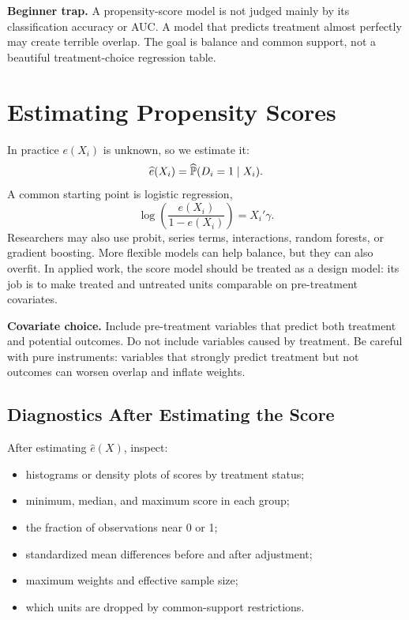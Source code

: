 \begin{boxF}
\textbf{Beginner trap.} A propensity-score model is not judged mainly by its
classification accuracy or AUC. A model that predicts treatment almost
perfectly may create terrible overlap. The goal is balance and common support,
not a beautiful treatment-choice regression table.
\end{boxF}

\section{Estimating Propensity Scores}

In practice \(e(X_i)\) is unknown, so we estimate it:
\[
    \widehat e(X_i)=\widehat{\mathbb{P}}(D_i=1\mid X_i).
\]
A common starting point is logistic regression,
\[
    \log\left(\frac{e(X_i)}{1-e(X_i)}\right)=X_i'\gamma.
\]
Researchers may also use probit, series terms, interactions, random forests, or
gradient boosting. More flexible models can help balance, but they can also
overfit. In applied work, the score model should be treated as a design model:
its job is to make treated and untreated units comparable on pre-treatment
covariates.

\begin{boxD}
\textbf{Covariate choice.} Include pre-treatment variables that predict both
treatment and potential outcomes. Do not include variables caused by treatment.
Be careful with pure instruments: variables that strongly predict treatment but
not outcomes can worsen overlap and inflate weights.
\end{boxD}

\subsection{Diagnostics After Estimating the Score}

After estimating \(\widehat e(X)\), inspect:
\begin{itemize}
    \item histograms or density plots of scores by treatment status;
    \item minimum, median, and maximum score in each group;
    \item the fraction of observations near 0 or 1;
    \item standardized mean differences before and after adjustment;
    \item maximum weights and effective sample size;
    \item which units are dropped by common-support restrictions.
\end{itemize}

